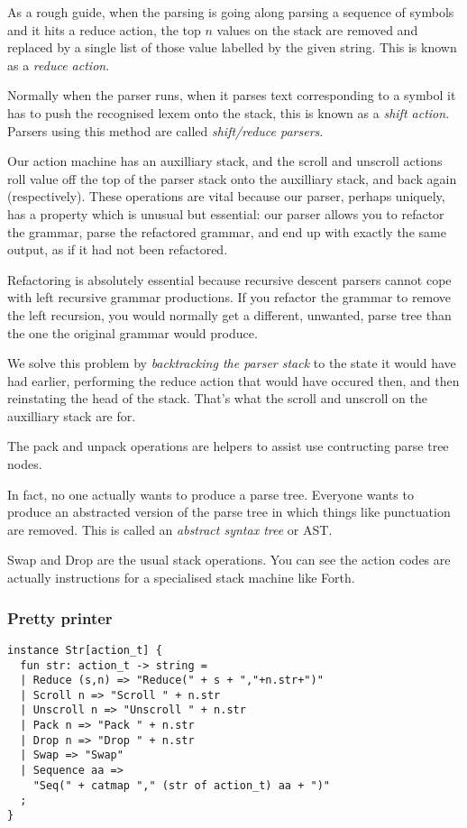 \documentclass[oneside]{book}
\begin{document}
As a rough guide, when the parsing is going along parsing
a sequence of symbols and it hits a reduce action,
the top $n$ values on the stack are removed and replaced
by a single list of those value labelled by the given string.
This is known as a {\em reduce action}.

Normally when the parser runs, when it parses text corresponding
to a symbol it has to push the recognised lexem onto the stack,
this is known as a {\em shift action}. Parsers using this
method are called {\em shift/reduce parsers}.

Our action machine has an auxilliary stack, and the scroll and
unscroll actions roll value off the top of the parser stack
onto the auxilliary stack, and back again (respectively).
These operations are vital because our parser, perhaps uniquely,
has a property which is unusual but essential: our parser allows
you to refactor the grammar, parse the refactored grammar, and
end up with exactly the same output, as if it had not been
refactored.

Refactoring is absolutely essential because recursive descent
parsers cannot cope with left recursive grammar productions.
If you refactor the grammar to remove the left recursion,
you would normally get a different, unwanted, parse tree
than the one the original grammar would produce.

We solve this problem by {\em backtracking the parser stack}
to the state it would have had earlier, performing the 
reduce action that would have occured then, and then
reinstating the head of the stack. That's what the
scroll and unscroll on the auxilliary stack are for.

The pack and unpack operations are helpers to assist use
contructing parse tree nodes. 

In fact, no one actually wants to produce a parse tree.
Everyone wants to produce an abstracted version of the
parse tree in which things like punctuation are removed.
This is called an {\em abstract syntax tree} or AST.

Swap and Drop are the usual stack operations.
You can see the action codes are actually instructions
for a specialised stack machine like Forth.


\subsubsection{Pretty printer}
\begin{verbatim}
instance Str[action_t] {
  fun str: action_t -> string =
  | Reduce (s,n) => "Reduce(" + s + ","+n.str+")"
  | Scroll n => "Scroll " + n.str
  | Unscroll n => "Unscroll " + n.str
  | Pack n => "Pack " + n.str
  | Drop n => "Drop " + n.str
  | Swap => "Swap"
  | Sequence aa =>
    "Seq(" + catmap "," (str of action_t) aa + ")"
  ;
}
\end{verbatim}
\end{document}
